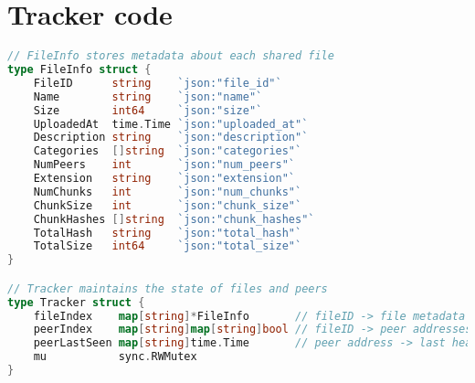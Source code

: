 \documentclass[12pt,a4paper]{report}
\begin{document}
\section{Tracker code}
\begin{lstlisting}[language=Go, caption={TCP transport implementation}, label={lst:tracker-code}]
// FileInfo stores metadata about each shared file
type FileInfo struct {
    FileID      string    `json:"file_id"`
    Name        string    `json:"name"`
    Size        int64     `json:"size"`
    UploadedAt  time.Time `json:"uploaded_at"`
    Description string    `json:"description"`
    Categories  []string  `json:"categories"`
    NumPeers    int       `json:"num_peers"`
    Extension   string    `json:"extension"`
    NumChunks   int       `json:"num_chunks"`
    ChunkSize   int       `json:"chunk_size"`
    ChunkHashes []string  `json:"chunk_hashes"`
    TotalHash   string    `json:"total_hash"`
    TotalSize   int64     `json:"total_size"`
}

// Tracker maintains the state of files and peers
type Tracker struct {
    fileIndex    map[string]*FileInfo       // fileID -> file metadata
    peerIndex    map[string]map[string]bool // fileID -> peer addresses
    peerLastSeen map[string]time.Time       // peer address -> last heartbeat
    mu           sync.RWMutex
}
\end{lstlisting}
\end{document}
